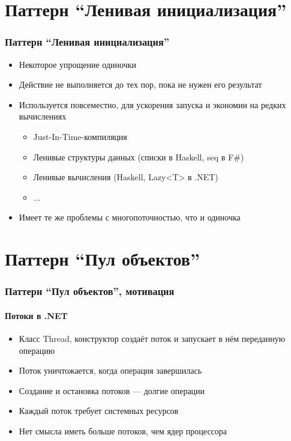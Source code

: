\documentclass{../cscslides}
\begin{document}
    \section{Паттерн ``Ленивая инициализация''}

    \begin{frame}
        \frametitle{Паттерн ``Ленивая инициализация''}
        \begin{itemize}
            \item Некоторое упрощение одиночки
            \item Действие не выполняется до тех пор, пока не нужен его результат
            \item Используется повсеместно, для ускорения запуска и экономии на редких вычислениях
            \begin{itemize}
                \item Just-In-Time-компиляция
                \item Ленивые структуры данных (списки в Haskell, seq в F\#)
                \item Ленивые вычисления (Haskell, Lazy<T> в .NET)
                \item ...
            \end{itemize}
            \item Имеет те же проблемы с многопоточностью, что и одиночка
        \end{itemize}
    \end{frame}

    \section{Паттерн ``Пул объектов''}

    \begin{frame}
        \frametitle{Паттерн ``Пул объектов'', мотивация}
        \framesubtitle{Потоки в .NET}
        \begin{itemize}
            \item Класс Thread, конструктор создаёт поток и запускает в нём переданную операцию
            \item Поток уничтожается, когда операция завершилась
            \item Создание и остановка потоков --- долгие операции
            \item Каждый поток требует системных ресурсов
            \item Нет смысла иметь больше потоков, чем ядер процессора
        \end{itemize}
    \end{frame}
\end{document}
